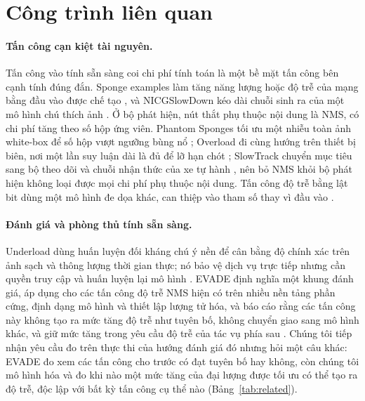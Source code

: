 \documentclass[a4paper,fleqn]{cas-dc}
\begin{document}
\section{Công trình liên quan}
\label{sec:related}
\paragraph{Tấn công cạn kiệt tài nguyên.}
Tấn công vào tính sẵn sàng coi chi phí tính toán là một bề mặt tấn công bên cạnh tính đúng đắn. Sponge examples làm tăng năng lượng hoặc độ trễ của mạng bằng đầu vào được chế tạo \cite{shumailov2021sponge}, và NICGSlowDown kéo dài chuỗi sinh ra của một mô hình chú thích ảnh \cite{nicgslowdown2022}. Ở bộ phát hiện, nút thắt phụ thuộc nội dung là NMS, có chi phí tăng theo số hộp ứng viên. Phantom Sponges tối ưu một nhiễu toàn ảnh white-box để số hộp vượt ngưỡng bùng nổ \cite{phantom2023}; Overload đi cùng hướng trên thiết bị biên, nơi một lần suy luận dài là đủ để lỡ hạn chót \cite{overload2024}; SlowTrack chuyển mục tiêu sang bộ theo dõi và chuỗi nhận thức của xe tự hành \cite{slowtrack2024}, nên bỏ NMS khỏi bộ phát hiện không loại được mọi chi phí phụ thuộc nội dung. Tấn công độ trễ bằng lật bit dùng một mô hình đe dọa khác, can thiệp vào tham số thay vì đầu vào \cite{bitflip2025}.

\paragraph{Đánh giá và phòng thủ tính sẵn sàng.}
Underload dùng huấn luyện đối kháng chú ý nền để cân bằng độ chính xác trên ảnh sạch và thông lượng thời gian thực; nó bảo vệ dịch vụ trực tiếp nhưng cần quyền truy cập và huấn luyện lại mô hình \cite{underload2025}. EVADE định nghĩa một khung đánh giá, áp dụng cho các tấn công độ trễ NMS hiện có trên nhiều nền tảng phần cứng, định dạng mô hình và thiết lập lượng tử hóa, và báo cáo rằng các tấn công này không tạo ra mức tăng độ trễ như tuyên bố, không chuyển giao sang mô hình khác, và giữ mức tăng trong yêu cầu độ trễ của tác vụ phía sau \cite{evade2025}. Chúng tôi tiếp nhận yêu cầu đo trên thực thi của hướng đánh giá đó nhưng hỏi một câu khác: EVADE đo xem các tấn công cho trước có đạt tuyên bố hay không, còn chúng tôi mô hình hóa và đo khi nào một mức tăng của đại lượng được tối ưu có thể tạo ra độ trễ, độc lập với bất kỳ tấn công cụ thể nào (Bảng~\ref{tab:related}).
\end{document}
